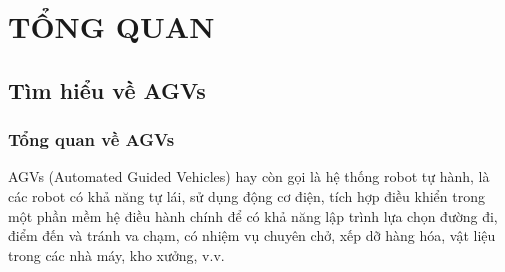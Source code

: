 \chapter{TỔNG QUAN}
    \section{Tìm hiểu về AGVs}
    \subsection{Tổng quan về AGVs}
    \hspace*{0.6cm} AGVs (Automated Guided Vehicles) hay còn gọi là hệ thống robot tự hành, là các robot có khả năng tự lái, sử dụng động cơ điện,
    tích hợp điều khiển trong một phần mềm hệ điều hành chính để có khả năng lập trình lựa chọn đường đi, điểm đến và tránh va chạm, 
    có nhiệm vụ chuyên chở, xếp dỡ hàng hóa, vật liệu trong các nhà máy, kho xưởng, v.v.
